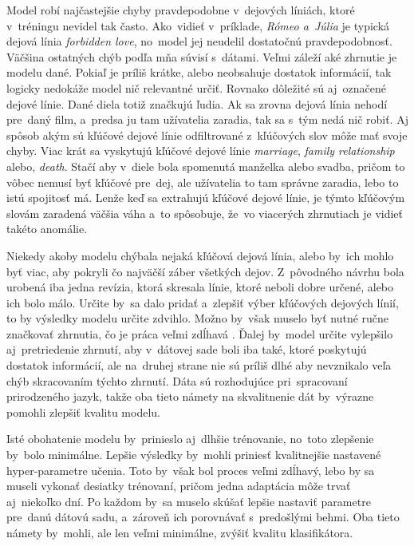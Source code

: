 Model robí najčastejšie chyby pravdepodobne v~dejových líniách, ktoré v~tréningu nevidel tak často. Ako~vidieť v~príklade, \textit{Rómeo a~Júlia} je typická dejová línia \textit{forbidden love}, no~model jej neudelil dostatočnú pravdepodobnosť. Väčšina ostatných chýb podľa mňa súvisí s~dátami. Veľmi záleží aké zhrnutie je modelu dané. Pokiaľ je príliš krátke, alebo neobsahuje dostatok informácií, tak logicky nedokáže model nič relevantné určiť. Rovnako dôležité sú aj~označené dejové línie. Dané diela totiž značkujú ľudia. Ak sa zrovna dejová línia nehodí pre~daný film, a~predsa ju tam užívatelia zaradia, tak sa s~tým nedá nič robiť. Aj spôsob akým sú kľúčové dejové línie odfiltrované z~kľúčových slov môže mať svoje chyby. Viac krát sa vyskytujú kľúčové dejové línie \textit{marriage}, \textit{family relationship} alebo, \textit{death}. Stačí aby v~diele bola spomenutá manželka alebo svadba, pričom to vôbec nemusí byť kľúčové pre~dej, ale užívatelia to tam správne zaradia, lebo to istú spojitosť má. Lenže keď sa extrahujú kľúčové dejové línie, je týmto kľúčovým slovám zaradená väčšia váha a~to spôsobuje, že~vo viacerých zhrnutiach je vidieť takéto anomálie. 

Niekedy akoby modelu chýbala nejaká kľúčová dejová línia, alebo by~ich mohlo byť viac, aby pokryli čo najväčší záber všetkých dejov. Z~pôvodného návrhu bola urobená iba jedna revízia, ktorá skresala línie, ktoré neboli dobre určené, alebo ich bolo málo. Určite by~sa dalo pridať a~zlepšiť výber kľúčových dejových línií, to by výsledky modelu určite zdvihlo. Možno by~však muselo byť nutné ručne značkovať zhrnutia, čo je práca veľmi zdĺhavá . Ďalej by~model určite vylepšilo aj~pretriedenie zhrnutí, aby v~dátovej sade boli iba také, ktoré poskytujú dostatok informácií, ale na~druhej strane nie sú príliš dlhé aby nevznikalo veľa chýb skracovaním týchto zhrnutí. Dáta sú rozhodujúce pri~spracovaní prirodzeného jazyk, takže oba tieto námety na skvalitnenie dát by~výrazne pomohli zlepšiť kvalitu modelu.

Isté obohatenie modelu by~prinieslo aj~dlhšie trénovanie, no~toto zlepšenie by~bolo minimálne. Lepšie výsledky by~mohli priniesť kvalitnejšie nastavené hyper-parametre učenia. Toto by~však bol proces veľmi zdĺhavý, lebo by sa museli vykonať desiatky trénovaní, pričom jedna adaptácia môže trvať aj~niekoľko dní. Po každom by~sa muselo skúšať lepšie nastaviť parametre pre~danú dátovú sadu, a~zároveň ich porovnávať s~predošlými behmi. Oba tieto námety by~mohli, ale len veľmi minimálne, zvýšiť kvalitu klasifikátora.

